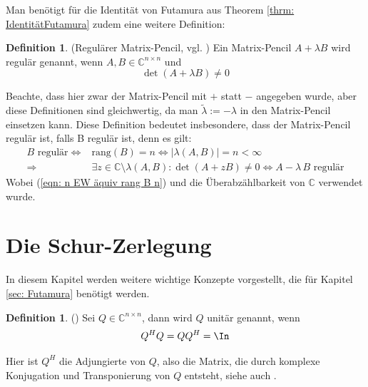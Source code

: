 \documentclass[a4paper,12pt]{report}
\newcommand{\C}{\mathbb C}
\newcommand{\rang}{\text{rang}}
\newcommand{\AlamB}{A-\lambda\,B}
\newcommand{\Cnn}{\C^{n\times n}}
\newcommand{\1}{\mathds{1}}
\theoremstyle{plain} %
\theoremstyle{definition} %
\newtheorem{definition}[theorem]{Definition}
\theoremstyle{remark}
\begin{document}
            Man benötigt für die Identität von Futamura aus Theorem \ref{thrm: IdentitätFutamura} zudem eine weitere Definition:
            \begin{definition}(Regulärer Matrix-Pencil, vgl. \cite[S. 784]{regularMatrixPencil})
                  \label{def: regulärer Pencil}
                  Ein Matrix-Pencil $A+\lambda B$ wird regulär genannt, wenn $A,B\in \Cnn$ und
                  $$\det(A+\lambda B)\ne 0$$ 
            \end{definition}

            Beachte, dass hier zwar der Matrix-Pencil mit $+$ statt $-$ angegeben wurde, aber diese Definitionen sind gleichwertig, da man $\tilde \lambda := -\lambda$ in den Matrix-Pencil einsetzen kann.
            Diese Definition bedeutet insbesondere, dass der Matrix-Pencil regulär ist, falls B regulär ist, denn es gilt:
            \begin{align*}
                  B\text{ regulär} \Leftrightarrow & \rang(B)=n\Leftrightarrow |\lambda(A,B)| = n<\infty\\
                  \Rightarrow & \exists z\in\C\setminus\lambda(A,B): \det(A+zB) \ne 0 \Leftrightarrow \AlamB \text{ regulär}
            \end{align*}
            Wobei (\ref{eqn: n EW äquiv rang B n}) und die Überabzählbarkeit von $\C$ verwendet wurde.
      \section{Die Schur-Zerlegung}
            In diesem Kapitel werden weitere wichtige Konzepte vorgestellt, die für Kapitel \ref{sec: Futamura} benötigt werden.

            \begin{definition}(\cite[S. 73]{matrixGolub})
                  Sei $Q \in\C^{n\times n}$, dann wird $Q$ unitär genannt, wenn
                  $$Q^HQ = QQ^H=\In$$
            \end{definition}

            Hier ist $Q^H$ die Adjungierte von $Q$, also die Matrix, die durch komplexe Konjugation und Transponierung von $Q$ entsteht, siehe auch \cite[S. 14]{matrixGolub}.
\end{document}
